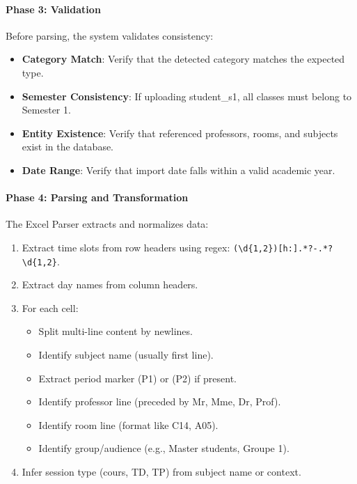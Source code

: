 \begin{fig}[H]
\paragraph{Phase 3: Validation}
Before parsing, the system validates consistency:

\begin{itemize}
    \item \textbf{Category Match}: Verify that the detected category matches the expected type.
    \item \textbf{Semester Consistency}: If uploading student\_s1, all classes must belong to Semester 1.
    \item \textbf{Entity Existence}: Verify that referenced professors, rooms, and subjects exist in the database.
    \item \textbf{Date Range}: Verify that import date falls within a valid academic year.
\end{itemize}

\paragraph{Phase 4: Parsing and Transformation}
The Excel Parser extracts and normalizes data:

\begin{enumerate}
    \item Extract time slots from row headers using regex: \texttt{(\textbackslash d\{1,2\})[h:].*?-.*?\textbackslash d\{1,2\}}.
    \item Extract day names from column headers.
    \item For each cell:
    \begin{itemize}
        \item Split multi-line content by newlines.
        \item Identify subject name (usually first line).
        \item Extract period marker (P1) or (P2) if present.
        \item Identify professor line (preceded by Mr, Mme, Dr, Prof).
        \item Identify room line (format like C14, A05).
        \item Identify group/audience (e.g., Master students, Groupe 1).
    \end{itemize}
    \item Infer session type (cours, TD, TP) from subject name or context.
\end{enumerate}


\end{fig}
